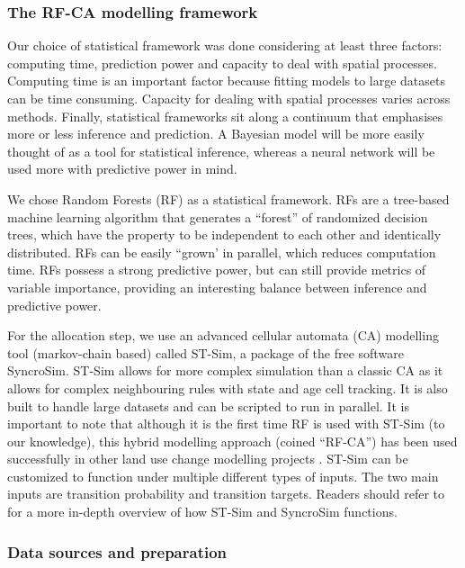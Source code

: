 \subsubsection{The RF-CA modelling framework}

Our choice of statistical framework was done considering at least three factors: computing time, prediction power and capacity to deal with spatial processes. Computing time is an important factor because fitting models to large datasets can be time consuming. Capacity for dealing with spatial processes varies across methods. Finally, statistical frameworks sit along a continuum that emphasises more or less inference and prediction. A Bayesian model will be more easily thought of as a tool for statistical inference, whereas a neural network will be used more with predictive power in mind.

We chose Random Forests (RF) as a statistical framework. RFs are a tree-based machine learning algorithm that generates a “forest” of randomized decision trees, which have the property to be independent to each other and identically distributed. RFs can be easily “grown’ in parallel, which reduces computation time. RFs possess a strong predictive power, but can still provide metrics of variable importance, providing an interesting balance between inference and predictive power.

For the allocation step, we use an advanced cellular automata (CA) modelling tool (markov-chain based) called ST-Sim, a package of the free software SyncroSim. ST-Sim allows for more complex simulation than a classic CA as it allows for complex neighbouring rules with state and age cell tracking. It is also built to handle large datasets and can be scripted to run in parallel. It is important to note that although it is the first time RF is used with ST-Sim (to our knowledge), this hybrid modelling approach (coined “RF-CA”) has been used successfully in other land use change modelling projects \citep{kamusoko_simulating_2015, gounaridis_random_2019}. ST-Sim can be customized to function under multiple different types of inputs. The two main inputs are transition probability and transition targets. Readers should refer to \cite{daniel_state-and-transition_2016} for a more in-depth overview of how ST-Sim and SyncroSim functions. \\

\subsubsection{Data sources and preparation}

